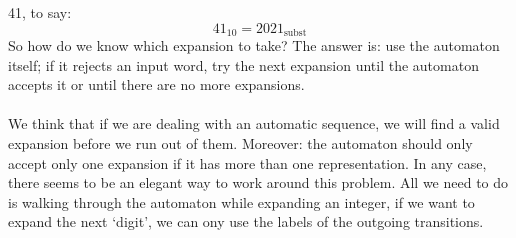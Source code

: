 \documentclass{article}
\begin{document}
41, to say:
\begin{displaymath}
41_{10} = 2021_{\mathrm{subst}}
\end{displaymath}
So how do we know which expansion to take? The answer is: use the automaton
itself; if it rejects an input word, try the next expansion until the
automaton accepts it or until there are no more expansions.\\
\\
We think that if we are dealing with an automatic sequence, we will find a 
valid expansion before we run out of them. Moreover: the automaton should only 
accept only one expansion if it has more than one representation. In any case, 
there seems to be an elegant way to work around this problem. All we need to 
do is walking through the automaton while expanding an integer, if we want to 
expand the next `digit', we can ony use the labels of the outgoing transitions.
\end{document}
